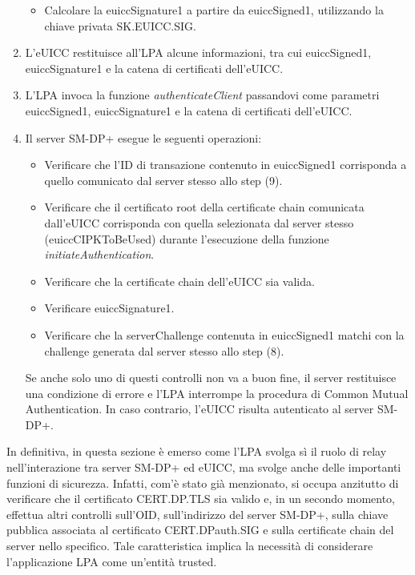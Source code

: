 \documentclass[10pt, oneside]{book}
\begin{document}
\begin{enumerate}
\begin{itemize}[itemsep=0pt]
\item Calcolare la euiccSignature1 a partire da euiccSigned1, utilizzando la chiave privata SK.EUICC.SIG.
\end{itemize}
\item L'eUICC restituisce all'LPA alcune informazioni, tra cui euiccSigned1, euiccSignature1 e la catena di certificati dell'eUICC.
\item L'LPA invoca la funzione \textit{authenticateClient} passandovi come parametri euiccSigned1, euiccSignature1 e la catena di certificati dell'eUICC.
\item Il server SM-DP+ esegue le seguenti operazioni:
\begin{itemize}[itemsep=0pt]
\item Verificare che l'ID di transazione contenuto in euiccSigned1 corrisponda a quello comunicato dal server stesso allo step (9).
\item Verificare che il certificato root della certificate chain comunicata dall'eUICC corrisponda con quella selezionata dal server stesso (euiccCIPKToBeUsed) durante l'esecuzione della funzione \textit{initiateAuthentication}.
\item Verificare che la certificate chain dell'eUICC sia valida.
\item Verificare euiccSignature1.
\item Verificare che la serverChallenge contenuta in euiccSigned1 matchi con la challenge generata dal server stesso allo step (8).
\end{itemize}
Se anche solo uno di questi controlli non va a buon fine, il server restituisce una condizione di errore e l'LPA interrompe la procedura di Common Mutual Authentication. In caso contrario, l'eUICC risulta autenticato al server SM-DP+.
\end{enumerate}
In definitiva, in questa sezione è emerso come l'LPA svolga sì il ruolo di relay nell'interazione tra server SM-DP+ ed eUICC, ma svolge anche delle importanti funzioni di sicurezza. Infatti, com'è stato già menzionato, si occupa anzitutto di verificare che il certificato CERT.DP.TLS sia valido e, in un secondo momento, effettua altri controlli sull'OID, sull'indirizzo del server SM-DP+, sulla chiave pubblica associata al certificato CERT.DPauth.SIG e sulla certificate chain del server nello specifico. Tale caratteristica implica la necessità di considerare l'applicazione LPA come un'entità trusted.
\end{document}
